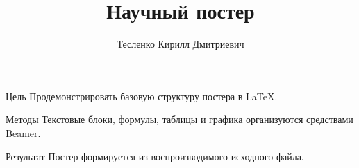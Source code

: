 \documentclass{beamer}
\title{Научный постер}
\author{Тесленко Кирилл Дмитриевич}
\begin{document}
\begin{frame}[t]
  \begin{block}{Цель}
    Продемонстрировать базовую структуру постера в LaTeX.
  \end{block}
  \begin{block}{Методы}
    Текстовые блоки, формулы, таблицы и графика организуются средствами Beamer.
  \end{block}
  \begin{block}{Результат}
    Постер формируется из воспроизводимого исходного файла.
  \end{block}
\end{frame}
\end{document}
